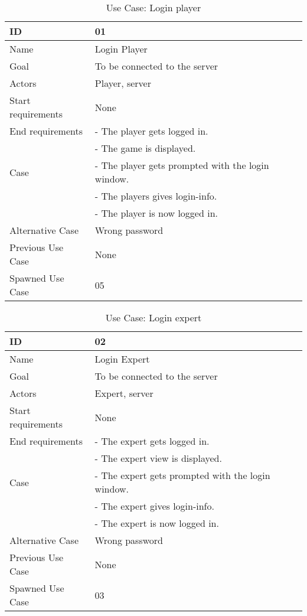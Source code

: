 \begin{table}[H]
\begin{tabular}{|l|l|} \hline
	ID & 01\\ \hline
	Name & Login Player\\ \hline
	Goal & To be connected to the server\\ \hline
	Actors & Player, server\\ \hline
	Start requirements & None\\ \hline
	End requirements & - The player gets logged in.\\
					 & - The game is displayed.\\ \hline
	Case & - The player gets prompted with the login window. \\
		 	& - The players gives login-info.\\
			& - The player is now logged in.\\ \hline
	Alternative Case & Wrong password\\ \hline
	Previous Use Case & None\\ \hline
	Spawned Use Case & 05\\ \hline
\end{tabular}
\caption{Use Case: Login player}
\label{fig:usecase01table}
\end{table}


\begin{table}[H]
\begin{tabular}{|l|l|} \hline
	ID & 02\\ \hline
	Name & Login Expert\\ \hline
	Goal & To be connected to the server\\ \hline
	Actors & Expert, server\\ \hline
	Start requirements & None\\ \hline
	End requirements & - The expert gets logged in.\\
					 & - The expert view is displayed.\\ \hline
	Case & - The expert gets prompted with the login window. \\
		 	& - The expert gives login-info.\\
			& - The expert is now logged in.\\ \hline
	Alternative Case & Wrong password\\ \hline
	Previous Use Case & None\\ \hline
	Spawned Use Case & 03\\ \hline
\end{tabular}
\caption{Use Case: Login expert}
\label{fig:usecase02table}
\end{table}

